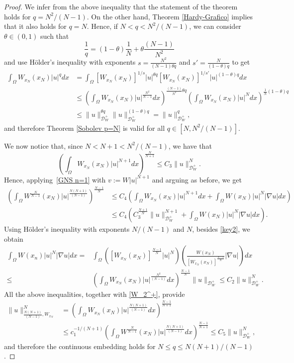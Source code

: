 \documentclass[12pt]{amsart}
\theoremstyle{definition}
\theoremstyle{plain}
\newcommand{\dint}{\int_{\Omega}}
\begin{document}
\begin{proof}
        We infer from the above inequality that the statement of the theorem holds 
        for $q=N^2/(N-1)$.  
        On the other hand, Theorem \ref{Hardy-Grafico} implies that it also holds 
        for $q=N$. Hence, if $N<q<N^2/(N-1)$, we can consider $\theta \in (0,1)$ such that
        $$
            \frac{1}{q} = (1-\theta)\frac{1}{N} + \theta \frac{(N-1)}{N^2}
        $$
        and use H\"older's inequality with exponents $s=\frac{N^2}{(N-1)\theta q}$ 
        and $s'=\frac{N}{(1-\theta)q}$ to get
        \begin{align*}
        \dint W_{x_N}(x_N)|u|^q dx &= \dint [W_{x_N}(x_N)]^{1/s} |u|^{\theta q} 
        [W_{x_N}(x_N)]^{1/s'}|u|^{(1-\theta)q} dx \\ & \leq \left( 
        \dint W_{x_N}(x_N)|u|^{\frac{N^2}{N-1}} dx \right)^{\frac{(N-1)}{N^2} 
        \theta q} \left( \dint W_{x_N}(x_N)|u|^{N} dx \right)^{\frac{1}{N}(1-\theta)q} \\
        & \leq \|u\|_{\mathcal{D}_W^+}^{\theta q} \|u\|_{\mathcal{D}_W^+}^{(1-\theta) q}  
        = \|u\|_{\mathcal{D}_W^+}^{q},
        \end{align*}
        and therefore  
        Theorem \ref{Sobolev p=N} is valid for all $q \in [N,N^2/(N-1)]$. 
        
        We now notice that, since $N<N+1<N^2/(N-1)$,  we have that
		$$
			\left(\dint W_{x_N}(x_N)|u|^{N+1}dx\right)^{\frac{N}{N+1}}\leq 
            C_3\|u\|_{\mathcal{D}_W^+}^N.
		$$
		Hence, applying~\eqref{GNS n=1} with $v:=W|u|^{N+1}$ and arguing as before, we get
			\begin{align*}
			\left(\dint W^{\frac{N}{N-1}}(x_N)|u|^{\frac{N(N+1)}{(N-1)}} \right)^{\frac{N-1}{N}}
            &\leq C_4\left(\dint W_{x_N}(x_N)|u|^{N+1}dx +\dint W(x_N)|u|^N
            |\nabla u|dx\right) \\
			   &\leq  C_4 \left( C_3^{\frac{N+1}{N}}\|u\|_{\mathcal{D}_W^+}^{N+1} + 
               \dint W(x_N)|u|^N|\nabla u|dx\right) .
		\end{align*}
		Using H\"older's inequality with exponents $N/(N-1)$ and $N$, 
        besides \eqref{key2}, we obtain
      \begin{align*}
			\dint  W(x_n)|u|^{N}|\nabla u|dx=&\dint \left( 
            [W_{x_N}(x_N)]^{\frac{N-1}{N}}|u|^N \right) 
            \left( \frac{W(x_N)}{[W_{x_N}(x_N)]^{\frac{N-1}{N}}}|\nabla u| \right)dx\\
			\leq&\left(\dint W_{x_N}(x_N)|u|^{\frac{N^2}{(N-1)}}dx\right)^{\frac{N-1}{N}} 
            \|u\|_{\mathcal{D}_W^+}  \leq C_2\|u\|_{\mathcal{D}_W^+}^{N}.
		\end{align*}
        All the above inequalities, together with \eqref{W_2^+}, provide
        \begin{align*}
			\|u\|_{\frac{N(N+1)}{(N-1)},W_{x_N}}^N & = \left(\dint 
            W_{x_N}(x_N)|u|^{\frac{N(N+1)}{(N-1)}}dx \right)^{\frac{N-1}{N+1}} \\
            &\leq c_1^{-1/(N+1)}\left(\dint W^{\frac{N}{N-1}}(x_N)|u|^{\frac{N(N+1)}{(N-1)}}dx 
            \right)^{\frac{N-1}{N+1}} \leq C_5 \|u\|_{\mathcal{D}_W^+}^N,
		\end{align*}
        and therefore  the continuous  embedding holds for $N \leq q \leq N(N+1)/(N-1)$.
		

\end{proof}
\end{document}
